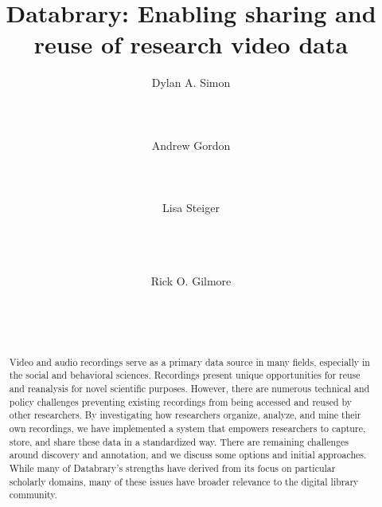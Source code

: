 \documentclass{sig-alternate}
\begin{document}

\title{Databrary: Enabling sharing and reuse of research video data}


\author{
\alignauthor
Dylan A. Simon\\
	\\
	\\
	\\
\alignauthor
Andrew Gordon\\
	\\
	\\
	\\
\alignauthor
Lisa Steiger\\
	\\
	\\
	\\
\and
Rick O. Gilmore\\
	\\
	\\
	\\
}

\maketitle

\begin{abstract}
Video and audio recordings serve as a primary data source in many fields, especially in the social and behavioral sciences.
Recordings present unique opportunities for reuse and reanalysis for novel scientific purposes.
However, there are numerous technical and policy challenges preventing existing recordings from being accessed and reused by other researchers.
By investigating how researchers organize, analyze, and mine their own recordings, we have implemented a system that empowers researchers to capture, store, and share these data in a standardized way.
There are remaining challenges around discovery and annotation, and we discuss some options and initial approaches.
While many of Databrary's strengths have derived from its focus on particular scholarly domains, many of these issues have broader relevance to the digital library community.
\end{abstract}
\end{document}
